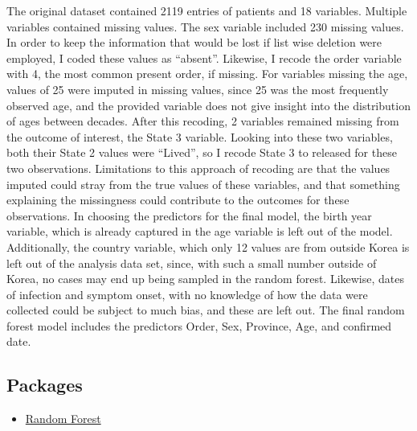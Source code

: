 \documentclass[
]{article}
\providecommand{\tightlist}{%
  \setlength{\itemsep}{0pt}\setlength{\parskip}{0pt}}
\begin{document}
The original dataset contained 2119 entries of patients and 18
variables. Multiple variables contained missing values. The sex variable
included 230 missing values. In order to keep the information that would
be lost if list wise deletion were employed, I coded these values as
``absent''. Likewise, I recode the order variable with 4, the most
common present order, if missing. For variables missing the age, values
of 25 were imputed in missing values, since 25 was the most frequently
observed age, and the provided variable does not give insight into the
distribution of ages between decades. After this recoding, 2 variables
remained missing from the outcome of interest, the State 3 variable.
Looking into these two variables, both their State 2 values were
``Lived'', so I recode State 3 to released for these two observations.
Limitations to this approach of recoding are that the values imputed
could stray from the true values of these variables, and that something
explaining the missingness could contribute to the outcomes for these
observations. In choosing the predictors for the final model, the birth
year variable, which is already captured in the age variable is left out
of the model. Additionally, the country variable, which only 12 values
are from outside Korea is left out of the analysis data set, since, with
such a small number outside of Korea, no cases may end up being sampled
in the random forest. Likewise, dates of infection and symptom onset,
with no knowledge of how the data were collected could be subject to
much bias, and these are left out. The final random forest model
includes the predictors Order, Sex, Province, Age, and confirmed date.

\hypertarget{packages}{%
\subsection{Packages}\label{packages}}

\begin{itemize}
\tightlist
\item
  \href{https://cran.r-project.org/web/packages/randomForest/randomForest.pdf}{Random
  Forest}
\end{itemize}
\end{document}
